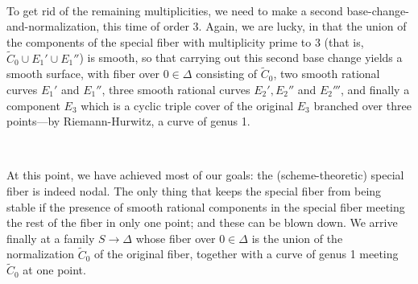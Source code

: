 \

To get rid of the remaining multiplicities, we need to make a second base-change-and-normalization, this time of order 3. Again, we are lucky, in that the union of the components of the special fiber with multiplicity prime to 3 (that is, $\tilde C_0 \cup E_1' \cup E_1''$) is smooth, so that carrying out this second base change yields a smooth surface, with fiber over $0 \in \Delta$ consisting of $\tilde C_0$, two smooth rational curves $E_1'$ and $E_1''$, three smooth rational curves $E_2', E_2''$ and $E_2'''$, and finally a component $E_3$ which is a cyclic triple cover of the original $E_3$ branched over three points---by Riemann-Hurwitz, a curve of genus 1.

\

At this point, we have achieved most of our goals: the (scheme-theoretic) special fiber is indeed nodal. The only thing that keeps the special fiber from being stable if the presence of smooth rational components in the special fiber meeting the rest of the fiber in only one point; and these can be blown down. We arrive finally at a family $S \to \Delta$ whose fiber over $0 \in \Delta$ is the union of the normalization $\tilde C_0$ of the original fiber, together with a curve of genus 1 meeting $\tilde C_0$ at one point.



%
%


